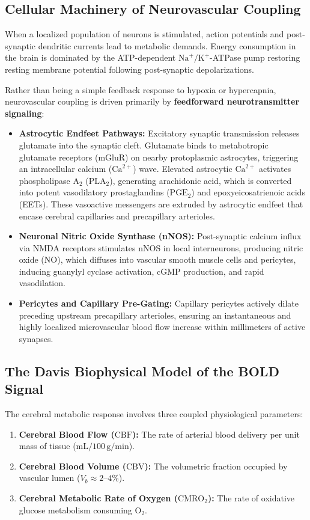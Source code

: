 \documentclass[11pt,a4paper]{article}
\begin{document}
\subsection{Cellular Machinery of Neurovascular Coupling}
When a localized population of neurons is stimulated, action potentials and post-synaptic dendritic currents lead to metabolic demands. Energy consumption in the brain is dominated by the ATP-dependent $\text{Na}^+/\text{K}^+$-ATPase pump restoring resting membrane potential following post-synaptic depolarizations.

Rather than being a simple feedback response to hypoxia or hypercapnia, neurovascular coupling is driven primarily by \textbf{feedforward neurotransmitter signaling}:
\begin{itemize}[leftmargin=2em]
    \item \textbf{Astrocytic Endfeet Pathways:} Excitatory synaptic transmission releases glutamate into the synaptic cleft. Glutamate binds to metabotropic glutamate receptors (mGluR) on nearby protoplasmic astrocytes, triggering an intracellular calcium ($\text{Ca}^{2+}$) wave. Elevated astrocytic $\text{Ca}^{2+}$ activates phospholipase $\text{A}_2$ ($\text{PLA}_2$), generating arachidonic acid, which is converted into potent vasodilatory prostaglandins ($\text{PGE}_2$) and epoxyeicosatrienoic acids (EETs). These vasoactive messengers are extruded by astrocytic endfeet that encase cerebral capillaries and precapillary arterioles.
    \item \textbf{Neuronal Nitric Oxide Synthase (nNOS):} Post-synaptic calcium influx via NMDA receptors stimulates nNOS in local interneurons, producing nitric oxide ($\text{NO}$), which diffuses into vascular smooth muscle cells and pericytes, inducing guanylyl cyclase activation, cGMP production, and rapid vasodilation.
    \item \textbf{Pericytes and Capillary Pre-Gating:} Capillary pericytes actively dilate preceding upstream precapillary arterioles, ensuring an instantaneous and highly localized microvascular blood flow increase within millimeters of active synapses.
\end{itemize}

\subsection{The Davis Biophysical Model of the BOLD Signal}
The cerebral metabolic response involves three coupled physiological parameters:
\begin{enumerate}
    \item \textbf{Cerebral Blood Flow ($\text{CBF}$):} The rate of arterial blood delivery per unit mass of tissue ($\text{mL} / 100\,\text{g} / \text{min}$).
    \item \textbf{Cerebral Blood Volume ($\text{CBV}$):} The volumetric fraction occupied by vascular lumen ($V_b \approx 2\text{--}4\%$).
    \item \textbf{Cerebral Metabolic Rate of Oxygen ($\text{CMRO}_2$):} The rate of oxidative glucose metabolism consuming $\text{O}_2$.
\end{enumerate}
\end{document}
